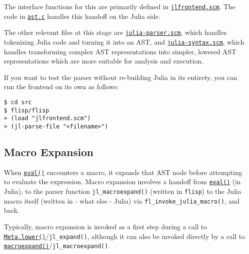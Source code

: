 The interface functions for this are primarily defined in \href{https://github.com/JuliaLang/julia/blob/master/src/jlfrontend.scm}{\texttt{jlfrontend.scm}}. The code in \href{https://github.com/JuliaLang/julia/blob/master/src/ast.c}{\texttt{ast.c}} handles this handoff on the Julia side.



The other relevant files at this stage are \href{https://github.com/JuliaLang/julia/blob/master/src/julia-parser.scm}{\texttt{julia-parser.scm}}, which handles tokenizing Julia code and turning it into an AST, and \href{https://github.com/JuliaLang/julia/blob/master/src/julia-syntax.scm}{\texttt{julia-syntax.scm}}, which handles transforming complex AST representations into simpler, {\textquotedbl}lowered{\textquotedbl} AST representations which are more suitable for analysis and execution.



If you want to test the parser without re-building Julia in its entirety, you can run the frontend on its own as follows:




\begin{lstlisting}
$ cd src
$ flisp/flisp
> (load "jlfrontend.scm")
> (jl-parse-file "<filename>")
\end{lstlisting}



\hypertarget{13925460440315781353}{}


\subsection{Macro Expansion}



When \hyperlink{7507639810592563424}{\texttt{eval()}} encounters a macro, it expands that AST node before attempting to evaluate the expression. Macro expansion involves a handoff from \hyperlink{7507639810592563424}{\texttt{eval()}} (in Julia), to the parser function \texttt{jl\_macroexpand()} (written in \texttt{flisp}) to the Julia macro itself (written in - what else - Julia) via \texttt{fl\_invoke\_julia\_macro()}, and back.



Typically, macro expansion is invoked as a first step during a call to \hyperlink{6644553029841096787}{\texttt{Meta.lower()}}/\texttt{jl\_expand()}, although it can also be invoked directly by a call to \hyperlink{8018172489611994488}{\texttt{macroexpand()}}/\texttt{jl\_macroexpand()}.



